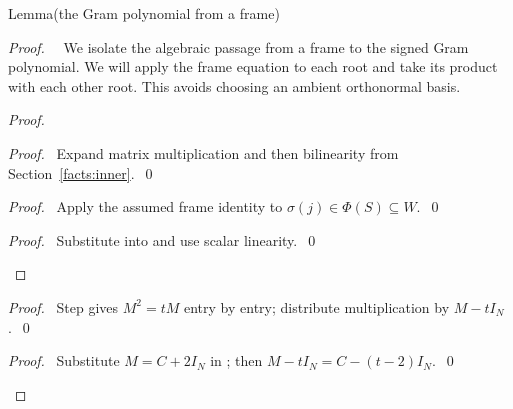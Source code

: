 \begin{namedresult}{Lemma}{(the Gram polynomial from a frame)}\label{lem:sec3-gram-polynomial}
\end{namedresult}
\begin{proof}
 \pfsketch\ \new\ We isolate the algebraic passage from a frame to the signed
 Gram polynomial. We will apply the frame equation to each root and take its product
 with each other root. This avoids choosing an ambient orthonormal basis.
 \begin{proof}
  \begin{proof}\pf\ Expand matrix multiplication and then bilinearity from Section~\ref{facts:inner}.~\qed\end{proof}
  \begin{proof}\pf\ Apply the assumed frame identity to $\sigma(j)\in\Phi(S)\subseteq W$.~\qed\end{proof}
  \qedstep
  \begin{proof}\pf\ Substitute  into  and use scalar linearity.~\qed\end{proof}
 \end{proof}
 \begin{proof}\pf\ Step  gives $M^2=tM$ entry by entry;
  distribute multiplication by $M-tI_N$.~\qed\end{proof}
 \qedstep
 \begin{proof}\pf\ Substitute $M=C+2I_N$ in ;
  then $M-tI_N=C-(t-2)I_N$.~\qed\end{proof}
\end{proof}

